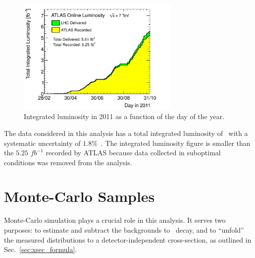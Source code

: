 \begin{figure}[phtb]
  \begin{center}
    \includegraphics[width=0.7\textwidth]{mc/fig/sumLumiByDay}
    \caption{ Integrated luminosity in 2011 as a function of the day of the year.}
    \label{fig:mc:lumi}
 \end{center}
\end{figure}

The data considered in this analysis has a total integrated luminosity of \lumitr\ with a systematic uncertainty of $1.8\%$~\cite{ATLAS-CONF-2012-080}. The integrated luminosity figure is smaller than the $5.25$ $fb^{-1}$ recorded by ATLAS because data collected in suboptimal conditions was removed from the analysis.

\section{Monte-Carlo Samples}
Monte-Carlo simulation plays a crucial role in this analysis. It serves two purposes: to estimate and subtract the backgrounds to \Wmn\ decay, and to ``unfold'' the measured distributions to a detector-independent cross-section, as outlined in Sec.~\ref{sec:xsec_formula}.

